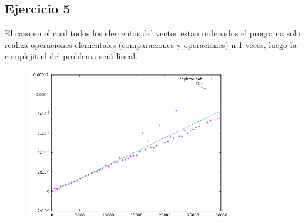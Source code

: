 \subsection*{Ejercicio 5}

\begin{flushleft}
  El caso en el cual todos los elementos del vector estan ordenados el
  programa solo realiza operaciones elementales (comparaciones y
  operaciones) n-1 veces, luego la complejitud del problema será lineal.

  \begin{figure}[H]
  \centering
    \includegraphics[width=0.8\textwidth]{resultado.png}
  \end{figure}
  
\end{flushleft}
